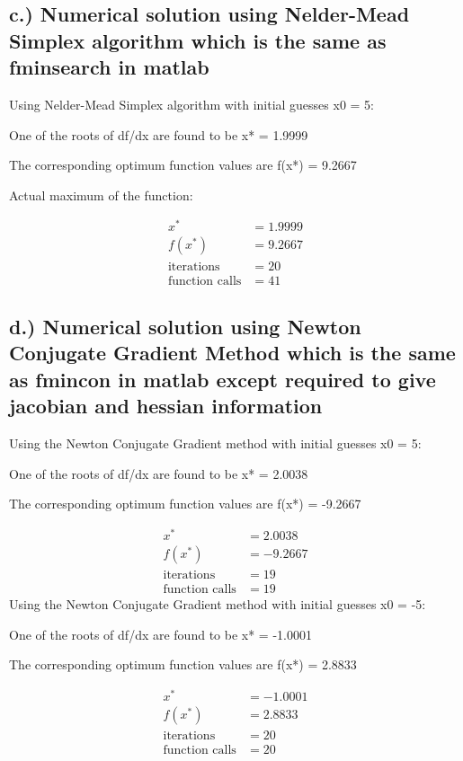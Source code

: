 \documentclass{article}%
\begin{document}
%
\subsection*{c.) Numerical solution using Nelder{-}Mead Simplex algorithm which is the same as fminsearch in matlab}%
\label{subsec:c.)NumericalsolutionusingNelder{-}MeadSimplexalgorithmwhichisthesameasfminsearchinmatlab}%
Using Nelder{-}Mead Simplex algorithm with initial guesses x0 = 5: %
\par%
One of the roots of df/dx are found to be x* = 1.9999%
\par%
The corresponding optimum function values are f(x*) = 9.2667%
\par%
Actual maximum of the function:%
\par%
\begin{align*}%
x^* &=  1.9999 \\%
f(x^*) &= 9.2667 \\%
\text{iterations} &= 20 \\%
\text{function calls} &= 41%
\end{align*}

%
\subsection*{d.) Numerical solution using Newton Conjugate Gradient Method which is the same as fmincon in matlab except required to give jacobian and hessian information}%
\label{subsec:d.)NumericalsolutionusingNewtonConjugateGradientMethodwhichisthesameasfminconinmatlabexceptrequiredtogivejacobianandhessianinformation}%
Using the Newton Conjugate Gradient method with initial guesses x0 = 5: %
\par%
One of the roots of df/dx are found to be x* = 2.0038%
\par%
The corresponding optimum function values are f(x*) = {-}9.2667%
\par%
\begin{align*}%
x^* &= 2.0038 \\%
f(x^*) &= -9.2667 \\%
\text{iterations} &= 19 \\%
\text{function calls} &= 19%
\end{align*}%
Using the Newton Conjugate Gradient method with initial guesses x0 = {-}5: %
\par%
One of the roots of df/dx are found to be x* = {-}1.0001%
\par%
The corresponding optimum function values are f(x*) = 2.8833%
\par%
\begin{align*}%
x^* &= -1.0001 \\%
f(x^*) &= 2.8833 \\%
\text{iterations} &= 20 \\%
\text{function calls} &= 20%
\end{align*}
\end{document}
